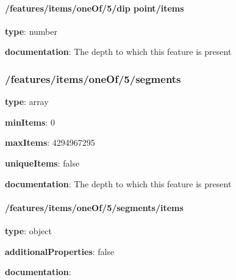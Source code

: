 \begin{itemized}
\paragraph{/features/items/oneOf/5/dip point/items} \begin{itemized}
\item {\bf type}: number
\end{itemized}\item {\bf documentation}: The depth to which this feature is present
\end{itemized}\subsubsection{/features/items/oneOf/5/segments} \begin{itemized}
\item {\bf type}: array
\item {\bf minItems}: 0
\item {\bf maxItems}: 4294967295
\item {\bf uniqueItems}: false
\item {\bf documentation}: The depth to which this feature is present
\paragraph{/features/items/oneOf/5/segments/items} \begin{itemized}
\item {\bf type}: object
\item {\bf additionalProperties}: false
\item {\bf documentation}: 
\end{itemized}\end{itemized}
